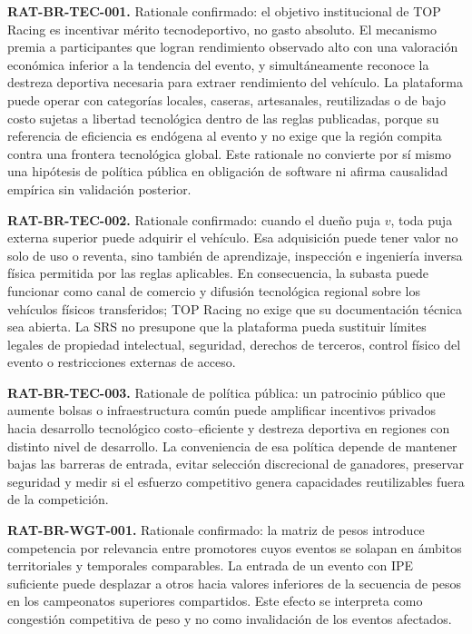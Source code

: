 \documentclass[10pt,letterpaper]{article}
\begin{document}
\noindent\textbf{RAT-BR-TEC-001.} Rationale confirmado: el objetivo institucional de TOP Racing es incentivar mérito tecnodeportivo, no gasto absoluto. El mecanismo premia a participantes que logran rendimiento observado alto con una valoración económica inferior a la tendencia del evento, y simultáneamente reconoce la destreza deportiva necesaria para extraer rendimiento del vehículo. La plataforma puede operar con categorías locales, caseras, artesanales, reutilizadas o de bajo costo sujetas a libertad tecnológica dentro de las reglas publicadas, porque su referencia de eficiencia es endógena al evento y no exige que la región compita contra una frontera tecnológica global. Este rationale no convierte por sí mismo una hipótesis de política pública en obligación de software ni afirma causalidad empírica sin validación posterior.\par
\noindent\textbf{RAT-BR-TEC-002.} Rationale confirmado: cuando el dueño puja $v$, toda puja externa superior puede adquirir el vehículo. Esa adquisición puede tener valor no solo de uso o reventa, sino también de aprendizaje, inspección e ingeniería inversa física permitida por las reglas aplicables. En consecuencia, la subasta puede funcionar como canal de comercio y difusión tecnológica regional sobre los vehículos físicos transferidos; TOP Racing no exige que su documentación técnica sea abierta. La SRS no presupone que la plataforma pueda sustituir límites legales de propiedad intelectual, seguridad, derechos de terceros, control físico del evento o restricciones externas de acceso.\par
\noindent\textbf{RAT-BR-TEC-003.} Rationale de política pública: un patrocinio público que aumente bolsas o infraestructura común puede amplificar incentivos privados hacia desarrollo tecnológico costo--eficiente y destreza deportiva en regiones con distinto nivel de desarrollo. La conveniencia de esa política depende de mantener bajas las barreras de entrada, evitar selección discrecional de ganadores, preservar seguridad y medir si el esfuerzo competitivo genera capacidades reutilizables fuera de la competición.\par
\noindent\textbf{RAT-BR-WGT-001.} Rationale confirmado: la matriz de pesos introduce competencia por relevancia entre promotores cuyos eventos se solapan en ámbitos territoriales y temporales comparables. La entrada de un evento con IPE suficiente puede desplazar a otros hacia valores inferiores de la secuencia de pesos en los campeonatos superiores compartidos. Este efecto se interpreta como congestión competitiva de peso y no como invalidación de los eventos afectados.\par
\end{document}
